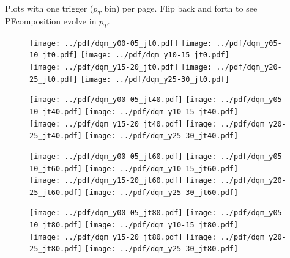 \documentclass[landscape,10pt]{beamer} %
\begin{document}
Plots with one trigger ($p_T$ bin) per page. Flip back and forth to see PFcomposition evolve in $p_T$.

\newpage

\begin{figure}[p]
\centering
\texttt{[image: ../pdf/dqm\_y00-05\_jt0.pdf]}
\texttt{[image: ../pdf/dqm\_y05-10\_jt0.pdf]}
\texttt{[image: ../pdf/dqm\_y10-15\_jt0.pdf]}\\
\texttt{[image: ../pdf/dqm\_y15-20\_jt0.pdf]}
\texttt{[image: ../pdf/dqm\_y20-25\_jt0.pdf]}
\texttt{[image: ../pdf/dqm\_y25-30\_jt0.pdf]}
\end{figure}

\begin{figure}[p]
\centering
\texttt{[image: ../pdf/dqm\_y00-05\_jt40.pdf]}
\texttt{[image: ../pdf/dqm\_y05-10\_jt40.pdf]}
\texttt{[image: ../pdf/dqm\_y10-15\_jt40.pdf]}\\
\texttt{[image: ../pdf/dqm\_y15-20\_jt40.pdf]}
\texttt{[image: ../pdf/dqm\_y20-25\_jt40.pdf]}
\texttt{[image: ../pdf/dqm\_y25-30\_jt40.pdf]}
\end{figure}

\newpage

\begin{figure}[p]
\centering
\texttt{[image: ../pdf/dqm\_y00-05\_jt60.pdf]}
\texttt{[image: ../pdf/dqm\_y05-10\_jt60.pdf]}
\texttt{[image: ../pdf/dqm\_y10-15\_jt60.pdf]}\\
\texttt{[image: ../pdf/dqm\_y15-20\_jt60.pdf]}
\texttt{[image: ../pdf/dqm\_y20-25\_jt60.pdf]}
\texttt{[image: ../pdf/dqm\_y25-30\_jt60.pdf]}
\end{figure}

\newpage

\begin{figure}[p]
\centering
\texttt{[image: ../pdf/dqm\_y00-05\_jt80.pdf]}
\texttt{[image: ../pdf/dqm\_y05-10\_jt80.pdf]}
\texttt{[image: ../pdf/dqm\_y10-15\_jt80.pdf]}\\
\texttt{[image: ../pdf/dqm\_y15-20\_jt80.pdf]}
\texttt{[image: ../pdf/dqm\_y20-25\_jt80.pdf]}
\texttt{[image: ../pdf/dqm\_y25-30\_jt80.pdf]}
\end{figure}
\end{document}
